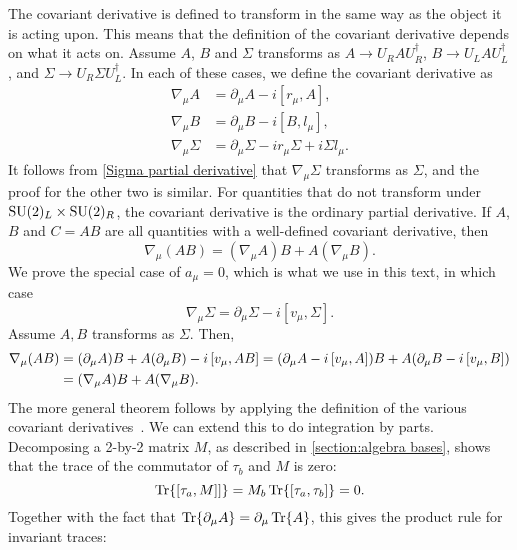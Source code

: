 The covariant derivative is defined to transform in the same way as the object it is acting upon.
This means that the definition of the covariant derivative depends on what it acts on.
Assume $A$, $B$ and $\Sigma$ transforms as $A \rightarrow U_R A U_R^\dagger$, $B \rightarrow U_L A U_L^\dagger$, and $\Sigma \rightarrow U_R \Sigma U_L^\dagger$.
In each of these cases, we define the covariant derivative as
\begin{align}
    \label{covariant derivative general}
    \nabla_\mu A &= \partial_\mu A - i [r_\mu, A], \\
    \nabla_\mu B &= \partial_\mu B - i [B, l_\mu], \\
    \nabla_\mu \Sigma &= \partial_\mu \Sigma - i r_\mu \Sigma + i \Sigma l_\mu.
\end{align}
It follows from \cref{Sigma partial derivative} that $\nabla_\mu \Sigma$ transforms as $\Sigma$, and the proof for the other two is similar.
For quantities that do not transform under $\mathrm{SU}(2)_L\times \mathrm{SU}(2)_R$, the covariant derivative is the ordinary partial derivative.
If $A$, $B$ and $C = AB$ are all quantities with a well-defined covariant derivative, then
\begin{equation}
    \nabla_\mu (AB) = (\nabla_\mu A) B + A (\nabla_\mu B).
\end{equation}
We prove the special case of $a_\mu = 0$, which is what we use in this text, in which case
\begin{equation}
    \nabla_\mu \Sigma = \partial_\mu \Sigma - i [v_\mu, \Sigma].
\end{equation}
Assume $A, B$ transforms as $\Sigma$. 
Then,
\begin{align*}
    \nabla_\mu (A B)
    & = (\partial_\mu A) B + A (\partial_\mu B) - i \left[v_\mu, AB \right]
    = (\partial_\mu A - i \left[v_\mu, A \right])B + A(\partial_\mu B- i \left[v_\mu, B \right])\\
    & = (\nabla_\mu A)B + A (\nabla_\mu B).
\end{align*}
The more general theorem follows by applying the definition of the various covariant derivatives~\cite{Scherer:PhysRevD.53.315}.
We can extend this to do integration by parts.
Decomposing a 2-by-2 matrix $M$, as described in \autoref{section:algebra bases}, shows that the trace of the commutator of $\tau_b$ and $M$ is zero:
\begin{equation*}
    \Tr{\left[\tau_a, M \right]]} = M_b\Tr{ \left[\tau_a, \tau_b \right]} = 0.
\end{equation*}
Together with the fact that $\Tr{\partial_\mu A} = \partial_\mu \Tr{A}$, this gives the product rule for invariant traces:
